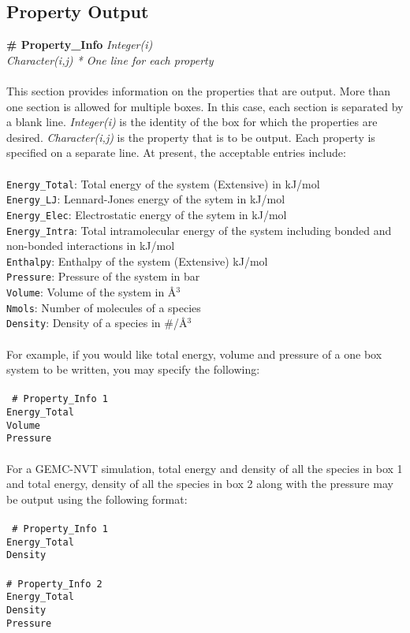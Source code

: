 {{{\subsection{Property Output}\label{sec:Property_Info}
{\bf \# Property\_Info} {\it Integer(i)} \\
{\it Character(i,j) * One line for each property} \\ \\
%
This section provides information on the properties that are output. More than one section is
allowed for multiple boxes. In this case, each section is separated by a blank line. {\it 
Integer(i)} is the identity of the box for which the properties are desired. {\it Character(i,j)}
is the property that is to be output. Each property is specified on a separate line. At present,
the acceptable entries include: \\ \\
%
\texttt{Energy\_Total}: Total energy of the system (Extensive) in kJ/mol \\
\texttt{Energy\_LJ}: Lennard-Jones energy of the sytem in kJ/mol \\
\texttt{Energy\_Elec}: Electrostatic energy of the sytem in kJ/mol \\
\texttt{Energy\_Intra}: Total intramolecular energy of the system including bonded and non-bonded 
interactions in kJ/mol \\
\texttt{Enthalpy}: Enthalpy of the system (Extensive) kJ/mol \\
\texttt{Pressure}: Pressure of the system in bar \\
\texttt{Volume}: Volume of the system in \AA$^3$ \\
\texttt{Nmols}: Number of molecules of a species \\
\texttt{Density}: Density of a species in \#/\AA$^3$ \\ \\
%
For example, if you would like total energy, volume and pressure of a one box system to be written, you may 
specify the following: \\ \\
%
\texttt{
\# Property\_Info 1 \\
Energy\_Total \\ 
Volume \\ 
Pressure \\ \\}
%
For a GEMC-NVT simulation, total energy and density of all the species in box 1 and total energy, density of
all the species in box 2 along with the pressure may be output using the following format: \\ \\
%
\texttt{
\# Property\_Info 1 \\
Energy\_Total \\
Density \\ \\
%
\# Property\_Info 2 \\
Energy\_Total \\
Density \\ 
Pressure }
%
%
%
}}}
